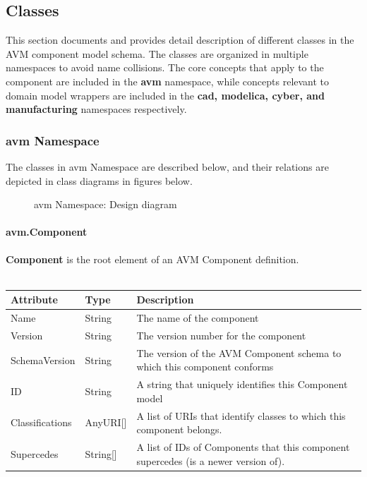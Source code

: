 \subsection{Classes}
This section documents and provides detail description of different classes in the AVM component model schema. The classes are organized in multiple namespaces to avoid name collisions. The core concepts that apply to the component are included in the \textbf{avm} namespace, while concepts relevant to domain model wrappers are included in the \textbf{cad, modelica, cyber, and manufacturing} namespaces respectively.

\subsubsection{avm Namespace}
The classes in avm Namespace are described below, and their relations are depicted in class diagrams in figures below.

\begin{figure}[h!]
\caption{avm Namespace: Design diagram}
\label{Design_Diagram}
\end{figure}


\paragraph{avm.Component}
{\bf Component} is the root element of an AVM Component definition.
\\ \\
\begin{tabular}{ l l p{12cm} }
\textbf{Attribute} & \textbf{Type} & \textbf{Description} \\ \hline
Name & String & The name of the component\\ \hline
Version & String & The version number for the component\\ \hline
SchemaVersion & String & The version of the AVM Component schema to which this component conforms\\ \hline
ID & String & A string that uniquely identifies this Component model\\ \hline
Classifications & AnyURI[] & A list of URIs that identify classes to which this component belongs.\\ \hline
Supercedes & String[] & A list of IDs of Components that this component supercedes (is a newer version of).
\end{tabular}


